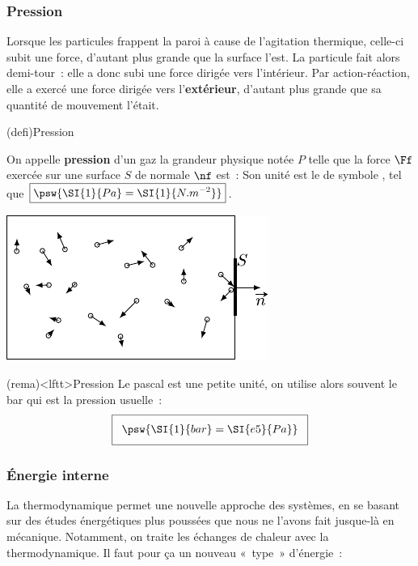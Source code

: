 \documentclass[../../main/main.tex]{subfiles}
\begin{document}
\subsubsection{Pression}
Lorsque les particules frappent la paroi à cause de l'agitation thermique,
celle-ci subit une force, d'autant plus grande que la surface l'est. La
particule fait alors demi-tour~: elle a donc subi une force dirigée vers
l'intérieur. Par action-réaction, elle a exercé une force dirigée vers
l'\textbf{extérieur}, d'autant plus grande que sa quantité de mouvement l'était.
\begin{tcb*}(defi){Pression}
	\noindent
	\begin{minipage}[c]{.70\linewidth}
		On appelle \textbf{pression} d'un gaz la grandeur physique notée $P$ telle que
		la force $\Ff$ exercée sur une surface $S$ de normale $\nf$ est~:
		\psw{%
			\[
				\setlength{\fboxsep}{3mm}
				\boxed{\Ff = PS \nf}
			\]
		}%
		Son unité est le  de symbole , tel que
		$\boxed{\psw{\SI{1}{Pa} = \SI{1}{N.m^{-2}}}}$.
	\end{minipage}
	\hfill
	\begin{minipage}[c]{.25\linewidth}
		\vspace{0pt}
		\begin{center}
			\includegraphics[width=\linewidth]{press_sch}
		\end{center}
	\end{minipage}
\end{tcb*}
\begin{tcb}(rema)<lftt>{Pression}
	Le pascal est une petite unité, on utilise alors souvent le bar qui est la
	pression usuelle~:
	\[
		\setlength{\fboxsep}{3mm}
		\boxed{\psw{\SI{1}{bar} = \SI{e5}{Pa}}}
	\]
\end{tcb}

\subsubsection{Énergie interne}
La thermodynamique permet une nouvelle approche des systèmes, en se basant sur
des études énergétiques plus poussées que nous ne l'avons fait jusque-là en
mécanique. Notamment, on traite les échanges de chaleur avec la thermodynamique.
Il faut pour ça un nouveau «~type~» d'énergie~:
\end{document}
